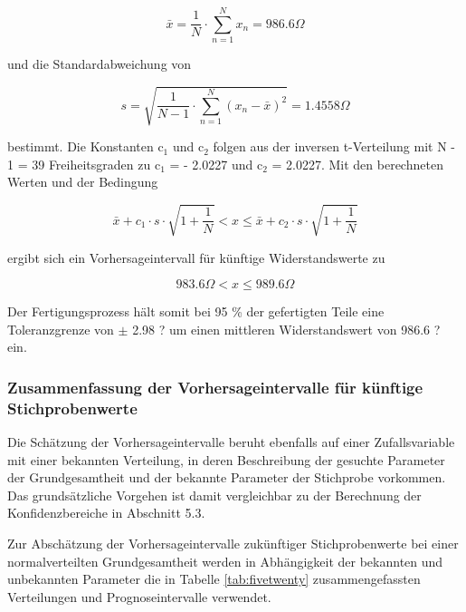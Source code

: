 \begin{equation}\label{eq:fivehundredfiftyfive}
\bar{x}=\dfrac{1}{N} \cdot \sum _{n=1}^{N}x_{n}  =986.6\Omega 
\end{equation}

\noindent und die Standardabweichung von

\begin{equation}\label{eq:fivehundredfiftysix}
s=\sqrt{\dfrac{1}{N-1} \cdot \sum _{n=1}^{N}\left(x_{n} -\bar{x}\right)^{2}} =1.4558 \Omega 
\end{equation}

\noindent bestimmt. Die Konstanten c${}_{1}$ und c${}_{2}$ folgen aus der inversen t-Verteilung mit N - 1 = 39 Freiheitsgraden zu c${}_{1}$ = - 2.0227 und c${}_{2}$ = 2.0227. Mit den berechneten Werten und der Bedingung

\begin{equation}\label{eq:fivehundredfiftyseven}
\bar{x}+c_{1} \cdot s\cdot \sqrt{1+\dfrac{1}{N} } <x\le \bar{x}+c_{2} \cdot s\cdot \sqrt{1+\dfrac{1}{N}}
\end{equation}

\noindent ergibt sich ein Vorhersageintervall f\"{u}r k\"{u}nftige Widerstandswerte zu 

\begin{equation}\label{eq:fivehundredfiftyeight}
983.6 \Omega <x\le 989.6 \Omega
\end{equation}

\noindent Der Fertigungsprozess h\"{a}lt somit bei 95 \% der gefertigten Teile eine Toleranzgrenze von $\mathrm{\pm}$ 2.98 ? um einen mittleren Widerstandswert von 986.6 ? ein.

\clearpage

\subsubsection{Zusammenfassung der Vorhersageintervalle f\"{u}r k\"{u}nftige Stichprobenwerte}

\noindent Die Sch\"{a}tzung der Vorhersageintervalle beruht ebenfalls auf einer Zufallsvariable mit einer bekannten Verteilung, in deren Beschreibung der gesuchte Parameter der Grundgesamtheit und der bekannte Parameter der Stichprobe vorkommen. Das grunds\"{a}tzliche Vorgehen ist damit vergleichbar zu der Berechnung der Konfidenzbereiche in Abschnitt 5.3.\newline

\noindent Zur Absch\"{a}tzung der Vorhersageintervalle zuk\"{u}nftiger Stichprobenwerte bei einer normalverteilten Grundgesamtheit werden in Abh\"{a}ngigkeit der bekannten und unbekannten Parameter die in Tabelle \ref{tab:fivetwenty} zusammengefassten Verteilungen und Prognoseintervalle verwendet.\newline

